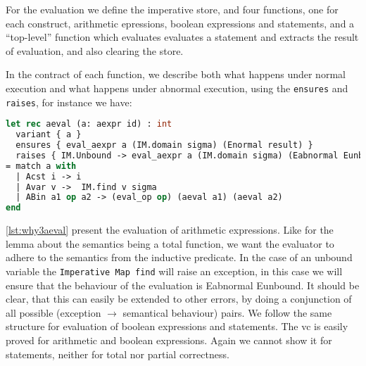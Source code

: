 For the evaluation we define the imperative store, and four functions, one for each construct,
arithmetic epressions, boolean expressions and statements, and a ``top-level'' function which evaluates
evaluates a statement and extracts the result of evaluation, and also clearing the store.

In the contract of each function, we describe both what happens under normal execution and what happens under abnormal execution, using the \texttt{ensures} and \texttt{raises}, for instance we have:

\begin{lstlisting}[caption={Evaluation of arithmetic expression},label={lst:why3aeval},language=sml]
let rec aeval (a: aexpr id) : int
  variant { a }
  ensures { eval_aexpr a (IM.domain sigma) (Enormal result) }
  raises { IM.Unbound -> eval_aexpr a (IM.domain sigma) (Eabnormal Eunbound) }
= match a with
  | Acst i -> i
  | Avar v ->  IM.find v sigma
  | ABin a1 op a2 -> (eval_op op) (aeval a1) (aeval a2)
end
\end{lstlisting}

\autoref{lst:why3aeval} present the evaluation of arithmetic expressions. Like for the lemma about the semantics
being a total function, we want the evaluator to adhere to the semantics from the inductive predicate.
In the case of an unbound variable the \texttt{Imperative Map find} will raise an exception, in this case
we will ensure that the behaviour of the evaluation is Eabnormal Eunbound.
It should be clear, that this can easily be extended to other errors, by doing a conjunction of
all possible (exception $\rightarrow$ semantical behaviour) pairs.
We follow the same structure for evaluation of boolean expressions and statements.
The vc is easily proved for arithmetic and boolean expressions.
Again we cannot show it for statements, neither for total nor partial correctness.